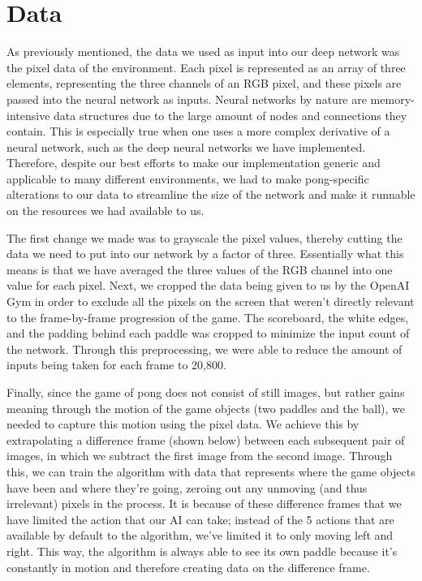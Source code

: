 \documentclass[12pt]{article}
\theoremstyle{plain}
\theoremstyle{definition}
\theoremstyle{remark}
\theoremstyle{plain}
\begin{document}
\section{Data}
\par
As previously mentioned, the data we used as input into our deep network was the pixel data of the environment.  Each pixel is represented as an array of three elements, representing the three channels of an RGB pixel, and these pixels are passed into the neural network as inputs.  Neural networks by nature are memory-intensive data structures due to the large amount of nodes and connections they contain.  This is especially true when one uses a more complex derivative of a neural network, such as the deep neural networks we have implemented.  Therefore, despite our best efforts to make our implementation generic and applicable to many different environments, we had to make pong-specific alterations to our data to streamline the size of the network and make it runnable on the resources we had available to us.
\par
The first change we made was to grayscale the pixel values, thereby cutting the data we need to put into our network by a factor of three.  Essentially what this means is that we have averaged the three values of the RGB channel into one value for each pixel.  Next, we cropped the data being given to us by the OpenAI Gym in order to exclude all the pixels on the screen that weren't directly relevant to the frame-by-frame progression of the game.  The scoreboard, the white edges, and the padding behind each paddle was cropped to minimize the input count of the network.  Through this preprocessing, we were able to reduce the amount of inputs being taken for each frame to 20,800.
\par
Finally, since the game of pong does not consist of still images, but rather gains meaning through the motion of the game objects (two paddles and the ball), we needed to capture this motion using the pixel data.  We achieve this by extrapolating a difference frame (shown below) between each subsequent pair of images, in which we subtract the first image from the second image.  Through this, we can train the algorithm with data that represents where the game objects have been and where they're going, zeroing out any unmoving (and thus irrelevant) pixels in the process.  It is because of these difference frames that we have limited the action that our AI can take; instead of the 5 actions that are available by default to the algorithm, we've limited it to only moving left and right.  This way, the algorithm is always able to see its own paddle because it's constantly in motion and therefore creating data on the difference frame.\newline
\end{document}
